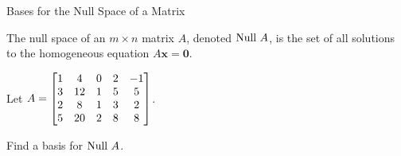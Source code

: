 \documentclass[xcolor=dvipsnames,aspectratio=169,t]{beamer}
\begin{document}
\begin{frame}{Bases for the Null Space of a Matrix}

\bbox
The \alert{null space} of an $m \times n$ matrix $A$, denoted \alert{$\mbox{Null } A$}, is the set of all solutions to the homogeneous equation $A \mathbf{x} = \mathbf{0}$.
\ebox

Let $\displaystyle A = \begin{bmatrix} 1 & 4 & 0 & 2 & -1\\ 3 & 12 & 1 & 5 & 5 \\ 2 & 8 & 1 & 3 & 2 \\ 5 & 20 & 2 & 8 & 8 \end{bmatrix}$.
\medskip

Find a basis for \alert{$\mbox{Null } A$}.


\end{frame}
\end{document}
